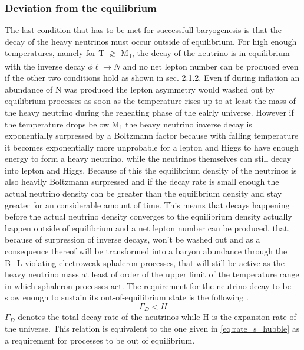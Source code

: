 \subsubsection{Deviation from the equilibrium}
The last condition that has to be met for successfull baryogenesis is that the decay of the heavy neutrinos must occur outside of equilibrium. For high enough temperatures, namely for T $\gtrsim$ M\textsubscript{1}, the decay of the neutrino is in equilibrium with the inverse decay $\phi\ell\rightarrow N$ and no net lepton number can be produced even if the other two conditions hold as shown in sec. 2.1.2. Even if during inflation an abundance of N was produced the lepton asymmetry would washed out by equilibrium processes as soon as the temperature rises up to at least the mass of the heavy neutrino during the reheating phase of the ealrly universe. \newline
However if the temperature drops below M$_1$ the heavy neutrino inverse decay is exponentially surpressed by a Boltzmann factor because with falling temperature it becomes exponentially more unprobable for a lepton and Higgs to have enough energy to form a heavy neutrino, while the neutrinos themselves can still decay into lepton and Higgs. Because of this the equilibrium density of the neutrinos is also heavily Boltzmann surpressed and if the decay rate is small enough the actual neutrino density can be greater than the equilibrium density and stay greater for an considerable amount of time. This means that decays happening before the actual neutrino density converges to the equilibrium density actually happen outside of equilibrium and a net lepton number can be produced, that, because of surpression of inverse decays, won't be washed out and as a consequence thereof will be transformed into a baryon abundance through the B+L violating electroweak sphaleron processes, that will still be active as the heavy neutrino mass at least of order of the upper limit of the temperature range in which sphaleron processes act. \newline
The requirement for the neutrino decay to be slow enough to sustain its out-of-equilibrium state is the following \cite[p. 30]{Taanila:2008}.
\begin{equation}
	\Gamma_D<H
	\label{eq:out_of_eq}
\end{equation}
$\Gamma_D$ denotes the total decay rate of the neutrinos while H is the expansion rate of the universe. This relation is equivalent to the one given in \ref{eq:rate_s_hubble} as a requirement for processes to be out of equilibrium. 